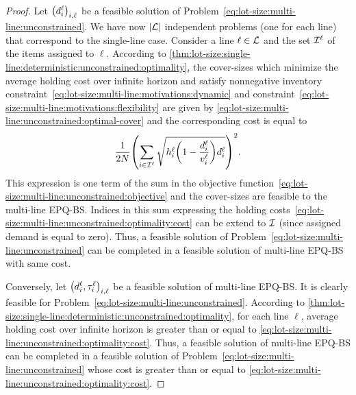 \begin{proof}
Let $\bracket{\demand_i^{\ell}}_{i,\ell}$ be a feasible solution of Problem~\eqref{eq:lot-size:multi-line:unconstrained}.
We have now $\card{\lines}$ independent problems (one for each line) that correspond to the single-line case.
Consider a line $\ell\in\mathcal{L}$ and the set $\mathcal{I}^{\ell}$ of the items assigned to $\ell$.
According to \cref{thm:lot-size:single-line:deterministic:unconstrained:optimality}, the cover-sizes which minimize the average holding cost over infinite horizon and satisfy nonnegative inventory constraint~\eqref{eq:lot-size:multi-line:motivations:dynamic} and constraint~\eqref{eq:lot-size:multi-line:motivations:flexibility} are given by \cref{eq:lot-size:multi-line:unconstrained:optimal-cover} and the corresponding cost is equal to
\begin{equation}\label{eq:lot-size:multi-line:unconstrained:optimality:cost}
  \frac{1}{2\nbsetups}\bracket{\sum_{i\in\REF^{\ell}}\sqrt{\holding_i^{\ell}\bracket{1-\frac{\demand_i^{\ell}}{\rate_i^{\ell}}}\demand_i^{\ell}}}^2.
\end{equation}
This expression is one term of the sum in the objective function~\eqref{eq:lot-size:multi-line:unconstrained:objective} and the cover-sizes are feasible to the multi-line EPQ-BS.
Indices in this sum expressing the holding costs~\eqref{eq:lot-size:multi-line:unconstrained:optimality:cost} can be extend to $\mathcal{I}$ (since assigned demand is equal to zero).
Thus, a feasible solution of Problem~\eqref{eq:lot-size:multi-line:unconstrained} can be completed in a feasible solution of multi-line EPQ-BS with same cost.


Conversely, let $\bracket{\demand_i^{\ell},\cover_i^{\ell}}_{i,\ell}$ be a feasible solution of multi-line EPQ-BS.
It is clearly feasible for Problem~\eqref{eq:lot-size:multi-line:unconstrained}.
According to \cref{thm:lot-size:single-line:deterministic:unconstrained:optimality}, for each line $\ell$, average holding cost over infinite horizon is greater than or equal to \eqref{eq:lot-size:multi-line:unconstrained:optimality:cost}.
Thus, a feasible solution of multi-line EPQ-BS can be completed in a feasible solution of Problem~\eqref{eq:lot-size:multi-line:unconstrained} whose cost is greater than or equal to \eqref{eq:lot-size:multi-line:unconstrained:optimality:cost}.
\end{proof}

